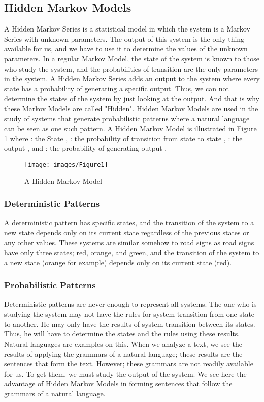 \documentclass{acm_proc_article-sp}
\begin{document}
\subsection{Hidden Markov Models}\label{Hidden-Markov-Models}
A Hidden Markov Series \cite{Rabiner1990} is a statistical model in which the system is a Markov Series with unknown parameters. The output of this system is the only thing available for us, and we have to use it to determine the values of the unknown parameters. In a regular Markov Model, the state of the system is known to those who study the system, and the probabilities of transition are the only parameters in the system. A Hidden Markov Series adds an output to the system where every state has a probability of generating a specific output. Thus, we can not determine the states of the system by just looking at the output. And that is why these Markov Models are called "Hidden". Hidden Markov Models are used in the study of systems that generate probabilistic patterns where a natural language can be seen as one such pattern. A Hidden Markov Model is illustrated in Figure \ref{A-Hidden-Markov-Model} where : the State , : the probability of transition from state  to state , : the output , and : the probability of generating output .

\begin{figure}
  \centering
  \texttt{[image: images/Figure1]}
  \caption{A Hidden Markov Model}\label{A-Hidden-Markov-Model}
\end{figure}

\subsubsection{Deterministic Patterns}\label{Deterministic-Patterns}
A deterministic pattern has specific states, and the transition of the system to a new state depends only on its current state regardless of the previous states or any other values. These systems are similar somehow to road signs as road signs have only three states; red, orange, and green, and the transition of the system to a new state (orange for example) depends only on its current state (red).

\subsubsection{Probabilistic Patterns}\label{Probabilistic-Patterns}
Deterministic patterns are never enough to represent all systems. The one who is studying the system may not have the rules for system transition from one state to another. He may only have the results of system transition between its states. Thus, he will have to determine the states and the rules using these results. Natural languages are examples on this. When we analyze a text, we see the results of applying the grammars of a natural language; these results are the sentences that form the text. However; these grammars are not readily available for us. To get them, we must study the output of the system. We see here the advantage of Hidden Markov Models in forming sentences that follow the grammars of a natural language.
\end{document}
